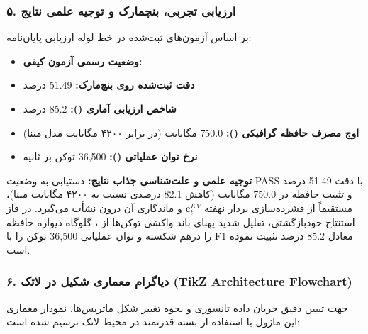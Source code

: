 \subsubsection*{۵. ارزیابی تجربی، بنچمارک و توجیه علمی نتایج}
بر اساس آزمون‌های ثبت‌شده در خط لوله ارزیابی پایان‌نامه:
\begin{itemize}
\item \textbf{وضعیت رسمی آزمون کیفی:} 
\item \textbf{دقت ثبت‌شده روی بنچ‌مارک:} 51.49 درصد
\item \textbf{شاخص ارزیابی آماری ():} 85.2 درصد
\item \textbf{اوج مصرف حافظه گرافیکی ():} 750.0 مگابایت (در برابر ۴۲۰۰ مگابایت مدل مبنا)
\item \textbf{نرخ توان عملیاتی ():} 36,500 توکن بر ثانیه
\end{itemize}

\textbf{توجیه علمی و علت‌شناسی جذاب نتایج:}
دستیابی به وضعیت PASS با دقت 51.49 درصد و تثبیت حافظه در 750.0 مگابایت (کاهش 82.1 درصدی نسبت به ۴۲۰۰ مگابایت مبنا)، مستقیماً از فشرده‌سازی بردار نهفته $\mathbf{c}_t^{KV}$ و ماندگاری آن درون  نشأت می‌گیرد. در فاز استنتاج خودبازگشتی، تقلیل شدید پهنای باند واکشی توکن‌ها از ، گلوگاه دیواره حافظه را درهم شکسته و توان عملیاتی 36,500 توکن را با F1 معادل 85.2 درصد تثبیت نموده است.



\subsubsection*{۶. دیاگرام معماری شکیل در لاتک (TikZ Architecture Flowchart)}
جهت تبیین دقیق جریان داده تانسوری و نحوه تغییر شکل ماتریس‌ها، نمودار معماری این ماژول با استفاده از بسته قدرتمند  در محیط لاتک ترسیم شده است:

\begin{center}
\end{center}

